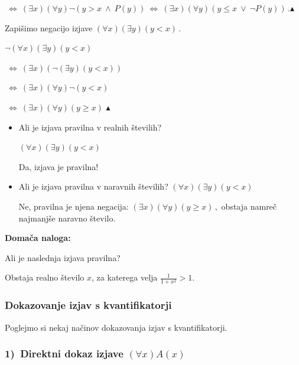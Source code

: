 \documentclass[12pt,a4paper]{article}
\def\ali {{~\vee~}}
\def\inn {{~\wedge~}}
\def\cee {{~\Leftrightarrow~}}
\def\zgled{\noindent{\bf\color{blue} Zgled: }}
\def\kz{{\hfill{\color{blue}$\blacktriangle$}}}%
\begin{document}
  $\cee(\exists  x)(\forall  y)\neg (y>x\inn P(y))\cee(\exists  x)(\forall  y)(y\le x\ali \neg P(y))\,.$\kz

\bigskip
\zgled
Zapišimo negacijo izjave
  $(\forall x)(\exists y)(y<x)\,.$

  $\neg(\forall x)(\exists y)(y<x)$

  $\cee (\exists x)(\neg(\exists y)(y<x))$

  $\cee (\exists x)(\forall y)\neg(y<x)$

  $\cee (\exists x)(\forall y)(y\ge x)$
  \kz

\begin{itemize}
  \item Ali je izjava pravilna v realnih številih?

  $(\forall x)(\exists y)(y<x)$

  Da, izjava je pravilna!

  \item Ali je izjava pravilna v naravnih številih?
  $(\forall x)(\exists y)(y<x)$

Ne, pravilna je njena negacija:
$(\exists x)(\forall y)(y\ge x)\,,$
obstaja namreč najmanjše naravno število.
\end{itemize}

{\bf Domača naloga:}

Ali je naslednja izjava pravilna?

Obstaja realno število $x$, za katerega velja $\frac{1}{1+x^2}>1$.

%
%
%
%
%
%
%


\subsubsection{Dokazovanje izjav s kvantifikatorji}

Poglejmo si nekaj načinov dokazovanja izjav s kvantifikatorji.

\subsubsection*{1)~Direktni dokaz izjave $(\forall x)A(x)$}
\end{document}
